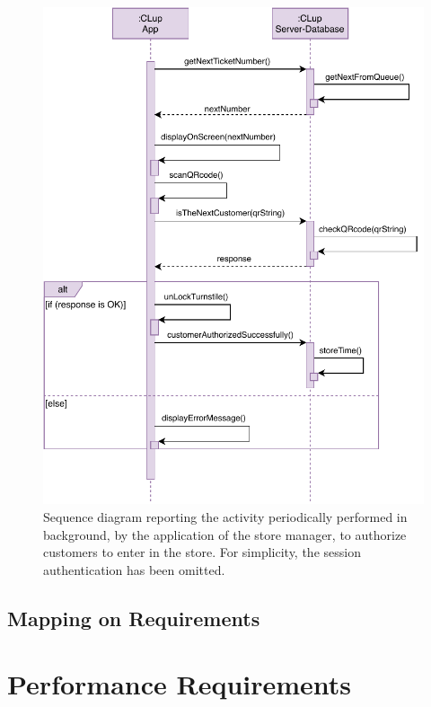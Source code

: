 \begin{figure}[H]
    \centering
    \includegraphics[width=1.0\textwidth]{images/authorizationToEnter_sequence_diagram.pdf}
    \caption{Sequence diagram reporting the activity periodically performed in background, by the application of the store manager, to authorize customers to enter in the store. For simplicity, the session authentication has been omitted.}
\end{figure}

\subsection{Mapping on Requirements}


\section{Performance Requirements}

